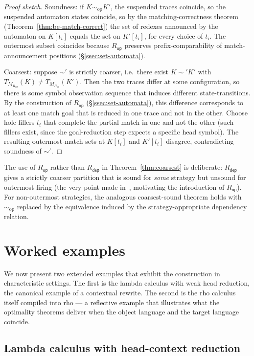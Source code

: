 \documentclass[11pt]{article}
\theoremstyle{plain}
\theoremstyle{definition}
\theoremstyle{remark}
\newcommand{\rdep}{R_{\mathsf{dep}}}
\newcommand{\rop}{R_{\mathsf{op}}}
\begin{document}
\begin{proof}[Proof sketch]
Soundness: if $K \sim_{\mathrm{op}} K'$, the suspended traces coincide, so
the suspended automaton states coincide, so by the matching-correctness
theorem (Theorem~\ref{thm:be-match-correct}) the set of redexes
announced by the automaton on $K[t_{i}]$ equals the set on $K'[t_{i}]$,
for every choice of $t_{i}$. The outermost subset coincides because
$\rop$ preserves prefix-comparability of match-announcement positions
(\S\ref{ssec:set-automata}).

Coarsest: suppose $\sim'$ is strictly coarser, i.e.\ there exist
$K \sim' K'$ with $T_{M_{\rop}}(K) \neq T_{M_{\rop}}(K')$. Then the two
traces differ at some configuration, so there is some symbol observation
sequence that induces different state-transitions. By the construction of
$\rop$ (\S\ref{ssec:set-automata}), this difference corresponds to at
least one match goal that is reduced in one trace and not in the other.
Choose hole-fillers $t_{i}$ that complete the partial match in one and
not the other (such fillers exist, since the goal-reduction step expects
a specific head symbol). The resulting outermost-match sets at $K[t_{i}]$
and $K'[t_{i}]$ disagree, contradicting soundness of $\sim'$.
\end{proof}

The use of $\rop$ rather than $\rdep$ in Theorem~\ref{thm:coarsest} is
deliberate: $\rdep$ gives a strictly coarser partition that is sound for
\emph{some} strategy but unsound for outermost firing (the very point
made in~\cite[\S 7]{BouwmanErkens2022}, motivating the introduction of
$\rop$). For non-outermost strategies, the analogous coarsest-sound theorem
holds with $\sim_{\mathrm{op}}$ replaced by the equivalence induced by
the strategy-appropriate dependency relation.

\section{Worked examples}\label{sec:examples}

We now present two extended examples that exhibit the construction in
characteristic settings. The first is the lambda calculus with weak
head reduction, the canonical example of a contextual rewrite. The
second is the rho calculus itself compiled into rho --- a reflective
example that illustrates what the optimality theorems deliver when
the object language and the target language coincide.

\subsection{Lambda calculus with head-context reduction}\label{ssec:lambda}
\end{document}
